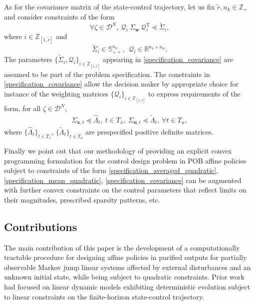 \documentclass[letterpaper,11pt]{article}
\newcommand{\T}{\mathrm{T}}
\begin{document}
As for the covariance matrix of the state-control trajectory, let us fix
$ \tilde{r}, n_k \in \mathbb{Z}_+$ and consider constraints of the form
\begin{equation}
\label{specification_covariance}
\forall   \zeta \in \mathscr{D}^N, ~  \mathcal{Q}_i  ~ \Sigma_\mathbf{w}  ~  \mathcal{Q}_i^\T \preceq \tilde{\Sigma}_i, 
\end{equation}
where $i \in \mathbb{Z}_{[1,\tilde{r}]} $
and 
\begin{equation}
\label{parameters_mean_quadratic}
\tilde{\Sigma}_i \in \mathbb{S}^{n_k}_{++},~~ 
\mathcal{Q}_i \in \mathbb{R}^{n_k \times n_w }.
\end{equation}
The parameters $ \{ \tilde{\Sigma}_i, \mathcal{Q}_i \}_{i \in \mathbb{Z}_{[1,\tilde{r}]}}$ appearing in \eqref{specification_covariance}
are assumed to be part of the problem specification.
The constraints in \eqref{specification_covariance} allow the decision maker 
by appropriate choice for instance of the weighting matrices $\{ \mathcal{Q}_i \}_{i \in \mathbb{Z}_{[1,\tilde{r}]}}$
to express requirements of the form, for all $  \zeta \in \mathscr{D}^N$,
\begin{eqnarray*}
	\Sigma_{\mathbf{x},t}  \preceq \hat{\Lambda}_t, ~ t \in T_x,~ 
	\Sigma_{\mathbf{u},t} \preceq \tilde{\Lambda}_t, ~ \forall t \in T_u,
\end{eqnarray*}
where $ \{ \hat{\Lambda}_t \}_{t \in T_x}$,  $ \{ \tilde{\Lambda}_t \}_{t \in T_u}$ are prespecified positive definite matrices.

Finally we point out that our methodology of providing an explicit convex
programming formulation for the control design problem in POB affine policies subject to constraints of the form  \eqref{specification_averaged_quadratic}, \eqref{specification_mean_quadratic}, \eqref{specification_covariance} can be augmented with further
convex constraints on the control parameters that reflect limits on their magnitudes, prescribed sparsity patterns, etc. 


\subsection{Contributions}

The main contribution of this paper is the development 
of a computationally tractable procedure for designing affine policies 
in purified outputs for partially observable Markov jump linear systems
affected by external  disturbances and an unknown initial state, while
being subject to quadratic constraints.
Prior work had focused on linear dynamic models exhibiting deterministic evolution  subject to linear constraints on the finite-horizon state-control trajectory. 
\end{document}
